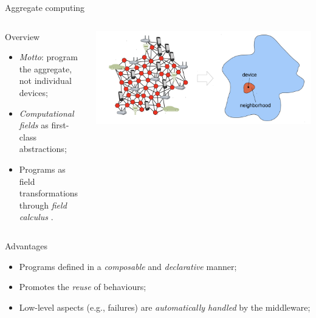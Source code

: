 \documentclass[presentation]{beamer}\mode<presentation>{\usetheme{AMSBolognaFC}}
\begin{document}
\begin{frame}[c]{Aggregate computing}
\begin{columns}
	\begin{column}{0.55\textwidth}
		\begin{block}{Overview}
			\begin{itemize}
				\item \emph{Motto}: program the aggregate, not individual devices;
				\item \emph{Computational fields} \cite{mamei2004cofields, viroli2019distributed} as first-class abstractions;
				\item Programs as field transformations through \emph{field calculus} \cite{viroli2016higher}.
			\end{itemize}
		\end{block}
	\end{column}
	\begin{column}{0.45\textwidth}
	\includegraphics[width=\textwidth]{img/ac.png}
	\end{column}
\end{columns}
	
\centering

\begin{alertblock}{Advantages}
	 	\begin{itemize}
	 		\item Programs defined in a \emph{composable} and \emph{declarative} manner;
	 		\item Promotes the \emph{reuse} of behaviours;
	 		\item Low-level aspects (e.g., failures) are \emph{automatically handled} by the middleware;
	 	\end{itemize}
\end{alertblock}


\end{frame}


\end{document}
